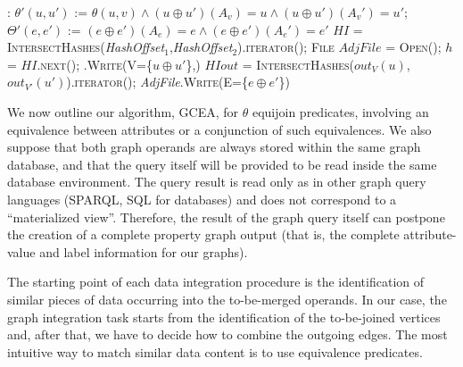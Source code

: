 \begin{algorithm}[!b]
{\begin{minipage}{\linewidth}
\begin{algorithmic}[1]
				:
				\State $\theta'(u,u')$ := $\theta(u,v)\wedge (u\oplus u')(A_v)=u\wedge (u\oplus u')(A_v')=u'$;
				\State $\Theta'(e,e')$ := $(e\oplus e')(A_e)=e \wedge (e\oplus e')(A_e')=e'$
				\State $HI$ = \textsc{IntersectHashes}(\textit{HashOffset}$_1$,\textit{HashOffset}$_2$).\textsc{iterator}();
				\State \textsc{File} $AdjFile$ = \textsc{Open}();
				\State $h$ = $HI$.\textsc{next}();
				.\textsc{Write}(V=\{$u\oplus u'$\},)
				\State $HIout$ = \textsc{IntersectHashes}($out_{V}(u)$,$out_{V'}(u')$).\textsc{iterator}();\label{code:vintersection}
				\State \textit{AdjFile}.\textsc{Write}(E=\{$e\oplus e'$\})
				\EndIf
				\EndFor
				\EndWhile
				\EndIf
				\EndFor
				\EndWhile

				\EndProcedure
			\end{algorithmic}
		\end{minipage}}
	\end{algorithm}
	We now outline our algorithm, GCEA, for $\theta$ equijoin predicates, involving an
equivalence between attributes or a conjunction of such equivalences. We also suppose that both graph operands are always stored within the same graph database, and that the query itself will be provided to be read inside the same database environment.
The query result
is read only as in other graph query languages (SPARQL, SQL for databases) and does not correspond to a ``materialized view''. Therefore, the result of the graph query itself can postpone the creation of a complete property graph output (that is, the complete attribute-value and label information for our graphs).

		The starting point of each data integration procedure is the identification of
		similar pieces of data occurring into the to-be-merged operands. In our case, the
	graph { {integration}} task starts from the identification of the to-be-joined vertices
		and, after that, we have to decide how to combine the outgoing edges. The most
		intuitive way to match similar data content is to use equivalence predicates.
		
